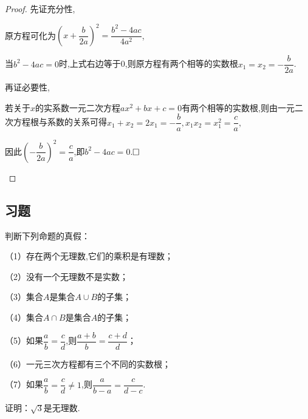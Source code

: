 \documentclass[lang=cn,math=cm,chinesefont=nofont,11pt,scheme=chinese,twocol]{elegantbook}
\begin{document}
\begin{proof}
  先证充分性,

  原方程可化为$\left(x+\dfrac{b}{2a}\right)^{2}=\dfrac{b^{2}-4ac}{4a^{2}}$,

  当$b^2-4ac=0$时,上式右边等于0,则原方程有两个相等的实数根$x_1=x_2=-\dfrac{b}{2a}$.

  再证必要性,
  
\begin{spacing}{1.8}
  若关于$x$的实系数一元二次方程$ax^2+bx+c=0$有两个相等的实数根,则由一元二次方程根与系数的关系可得$x_{1}+x_{2}=2x_{1}=-\dfrac{b}{a},x_{1}x_{2}=x_{1}^{2}=\dfrac{c}{a},$

  因此$\left(-\dfrac{b}{2a}\right)^{2}=\dfrac{c}{a}$,即$b^2-4ac=0$.$\hfill\square$
\end{spacing}

\end{proof}

\subsection{习题}

\begin{exercise}\label{2017RJB_bx1_P26}
  判断下列命题的真假：

  （1）存在两个无理数,它们的乘积是有理数；

  （2）没有一个无理数不是实数；

  （3）集合$A$是集合$A\cup B$的子集；

  （4）集合$A\cap B$是集合$A$的子集；

\begin{spacing}{2.0}
    （5）如果$\dfrac ab=\dfrac cd$,则$\dfrac{a+b}b=\dfrac{c+d}{d}$；

  （6）一元三次方程都有三个不同的实数根；
  
  （7）如果$\dfrac ab=\dfrac cd\neq 1$,则$\dfrac a{b-a}=\dfrac c{d-c}$.
\end{spacing}

\end{exercise}

\begin{exercise}\label{202407081520}
  证明：$\sqrt{3}$是无理数.
\end{exercise}
\end{document}
